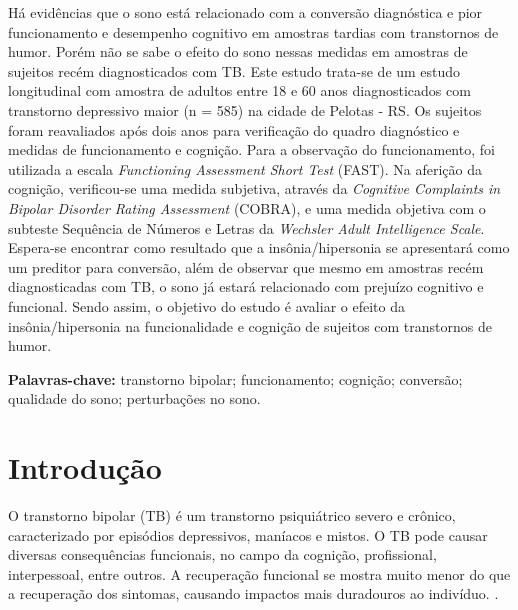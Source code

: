 \documentclass[chapter=TITLE,
               oneside,
               12pt,
               a4paper,
               english,
               brazil]{abntex2}    %
\begin{document}
\begin{resumo}

    Há evidências que o sono está relacionado com a conversão diagnóstica
    e pior funcionamento e desempenho cognitivo em amostras tardias com
    transtornos de humor.
    Porém não se sabe o efeito do sono nessas medidas em amostras de sujeitos
    recém diagnosticados com TB.
    Este estudo trata-se de um estudo longitudinal com amostra de adultos entre
    18 e 60 anos diagnosticados com transtorno depressivo maior (n = 585) na
    cidade de Pelotas - RS. Os sujeitos foram reavaliados após dois anos para
    verificação do quadro diagnóstico e medidas de funcionamento e cognição.
    Para a observação do funcionamento, foi utilizada a escala
    \textit{Functioning Assessment Short Test} (FAST). Na aferição da cognição,
    verificou-se uma medida subjetiva, através da
    \textit{Cognitive Complaints in Bipolar Disorder Rating Assessment} (COBRA),
    e uma medida objetiva com o subteste Sequência de Números e Letras da
    \textit{Wechsler Adult Intelligence Scale}.
    Espera-se encontrar como resultado que a insônia/hipersonia se apresentará
    como um preditor para conversão, além de observar que mesmo em amostras
    recém diagnosticadas com TB, o sono já estará relacionado com prejuízo
    cognitivo e funcional.
    Sendo assim, o objetivo do estudo é avaliar o efeito da
    insônia/hipersonia na funcionalidade e cognição de sujeitos com
    transtornos de humor.

    \vspace{\onelineskip}

    \textbf{Palavras-chave:} transtorno bipolar; funcionamento; cognição;
    conversão; qualidade do sono; perturbações no sono.

\end{resumo}

\textual

\begingroup
\renewcommand{\cleardoublepage}{}
\renewcommand{\clearpage}{}

\chapter{Introdução}\label{sec:introducao}
    
    O transtorno bipolar (TB) é um transtorno psiquiátrico severo e crônico,
    caracterizado por episódios depressivos, maníacos e mistos.
    O TB pode causar diversas consequências funcionais, no campo da cognição,
    profissional, interpessoal, entre outros.
    A recuperação funcional se mostra muito menor do que a recuperação dos
    sintomas, causando impactos mais duradouros ao indivíduo.
    \parencite{american_psychiatric_association_diagnostic_2013}.
    
\end{document}
